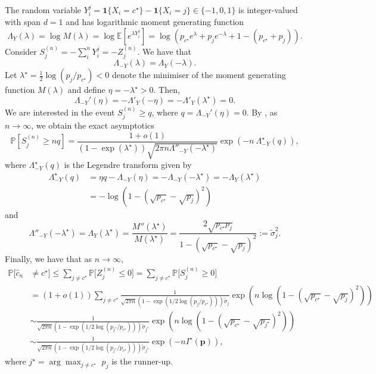 The random variable $Y_i^j = \mathbf 1\{X_i=c^\star\}-\mathbf 1\{X_i=j\} \in\{-1,0,1\}$ is integer-valued with span $d=1$ and has logarithmic moment generating function
$$
\Lambda_Y(\lambda) = \log M(\lambda) = \log \mathbb{E}\left[e^{\lambda Y_i^j}\right] = \log\left(p_{c^\star} e^{\lambda} + p_j e^{-\lambda} + 1- (p_{c^\star}+p_j)\right).
$$
Consider $S_j^{(n)}=-\sum_i^n Y_i^j = -Z_j^{(n)}$. We have that 
$$
\Lambda_{-Y}(\lambda) = \Lambda_Y(-\lambda). 
$$
Let $\lambda^\star =\tfrac{1}{2}\log(p_j/p_{c^\star}) < 0$ denote the minimiser of the moment generating function $M(\lambda)$ and define $\eta = -\lambda^\star>0$. 
Then, 
$$
\Lambda_{-Y}'(\eta) = -\Lambda'_Y(-\eta) = -\Lambda'_Y(\lambda^\star) =0.
$$
We are interested in the event $S_j^{(n)}\geq q$, where $q=\Lambda_{-Y}'(\eta)=0$. 
By \citet[Theorem 3.7.4. (b)]{dembo2010ldp}, as $n\to \infty$, we obtain the exact asymptotics 
$$
\mathbb{P}\left[S_j^{(n)}\geq nq\right] = \frac{1+o(1)}{(1-\exp(\lambda^\star))\sqrt{2\pi n\Lambda''_{-Y}(-\lambda^\star)}}\exp\left(-n\ \Lambda^\star_{-Y}(q)\right),
$$
where $\Lambda^\star_{-Y}(q)$ is the Legendre transform given by
\begin{align*}
 \Lambda^\star_{-Y}(q) &= \eta q - \Lambda_{-Y}(\eta) = -\Lambda_{-Y}(-\lambda^\star) = -\Lambda_{Y}(\lambda^\star)\\
 &=-\log\left(1-\left(\sqrt{p_{c^\star}}-\sqrt{p_j}\right)^2\right)
\end{align*}
and 
$$
\Lambda''_{-Y}(-\lambda^\star) = \Lambda_Y(\lambda^\star) = \frac{M''(\lambda^\star)}{M(\lambda^\star)} = \frac{2\sqrt{p_{c^\star} p_j}}{1-(\sqrt{p_{c^\star}}- \sqrt{p_j})^2}:=\tilde \sigma_j^2.
$$
Finally, we have that as $n\to\infty$,
\begin{align*}
    \mathbb{P}\bigl[\hat{c}_n&\neq c^\star\bigr]
    \le \sum_{j\neq c^\star}\mathbb{P}\bigl[Z_j^{(n)}\le 0\bigr]
    =\sum_{j\neq c^\star}\mathbb{P}\bigl[S_j^{(n)}\ge 0\bigr]\\
    &=(1+o(1))\sum_{j\neq c^\star}\frac{1}{\sqrt{2\pi n}(1-\exp(1/2\log(p_j/p_{c^\star})))\tilde\sigma_j}\exp\left(n\log(1-(\sqrt{p_{c^\star}}-\sqrt{p_j})^2)\right)\\
    &\sim \frac{1}{\sqrt{2\pi n}(1-\exp(1/2\log(p_{j^\star}/p_{c^\star})))\tilde\sigma_{j^\star}}\exp\left(n\log(1-(\sqrt{p_{c^\star}}-\sqrt{p_{j^\star}})^2)\right)\\
    &\sim \frac{1}{\sqrt{2\pi n}(1-\exp(1/2\log(p_{j^\star}/p_{c^\star})))\tilde\sigma_{j^\star}}\exp\left(-n I^\star(\mathbf{p})\right),
\end{align*}
where
${j^\star} = \arg\max_{j \neq c^\star}\,\, p_j$ is the runner-up.